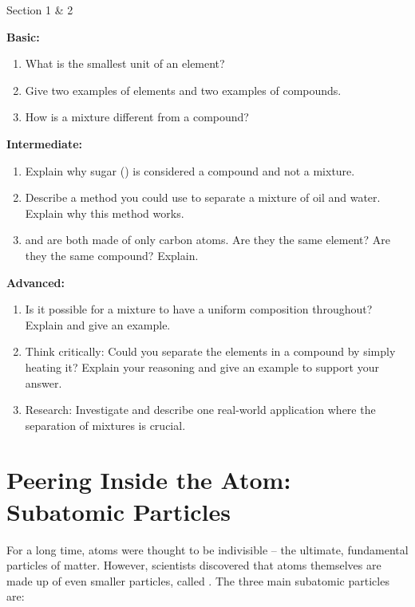 \begin{tieredquestions}{Section 1 & 2}

\textbf{Basic:}
\begin{enumerate}
    \item What is the smallest unit of an element?
    \item Give two examples of elements and two examples of compounds.
    \item How is a mixture different from a compound?
\end{enumerate}

\textbf{Intermediate:}
\begin{enumerate}
    \item Explain why sugar () is considered a compound and not a mixture.
    \item Describe a method you could use to separate a mixture of oil and water. Explain why this method works.
    \item {} and  are both made of only carbon atoms. Are they the same element? Are they the same compound? Explain.
\end{enumerate}

\textbf{Advanced:}
\begin{enumerate}
    \item  Is it possible for a mixture to have a uniform composition throughout? Explain and give an example.
    \item  Think critically: Could you separate the elements in a compound by simply heating it? Explain your reasoning and give an example to support your answer.
    \item Research: Investigate and describe one real-world application where the separation of mixtures is crucial.
\end{enumerate}

\end{tieredquestions}

\section{Peering Inside the Atom: Subatomic Particles}


For a long time, atoms were thought to be indivisible – the ultimate, fundamental particles of matter. However, scientists discovered that atoms themselves are made up of even smaller particles, called . The three main subatomic particles are:

